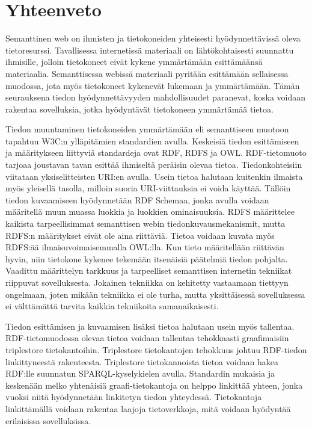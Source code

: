 \documentclass[finnish, 12pt, a4paper, elec, utf8, pdfa, online]{aaltothesis}
\begin{document}
{%
\clearpage
\section{Yhteenveto}
\enlargethispage{-2\baselineskip}

Semanttinen web on ihmisten ja tietokoneiden yhteisesti hyödynnettävissä oleva tietoresurssi. Tavallisessa internetissä materiaali on lähtökohtaisesti suunnattu ihmisille, jolloin tietokoneet eivät kykene ymmärtämään esittämäänsä materiaalia. Semanttisessa webissä materiaali pyritään esittämään sellaisessa muodossa, jota myös tietokoneet kykenevät lukemaan ja ymmärtämään. Tämän seurauksena tiedon hyödynnettävyyden mahdollisuudet paranevat, koska voidaan rakentaa sovelluksia, jotka hyödyntävät tietokoneen ymmärtämää tietoa.

Tiedon muuntaminen tietokoneiden ymmärtämään eli semanttiseen muotoon tapahtuu W3C:n ylläpitämien standardien avulla. Keskeisiä tiedon esittämiseen ja määritykseen liittyviä standardeja ovat RDF, RDFS ja OWL. RDF-tietomuoto tarjoaa joustavan tavan esittää ihmiseltä peräisin olevaa tietoa. Tiedonkohteisiin viitataan yksiselitteisten URI:en avulla. Usein tietoa halutaan kuitenkin ilmaista myös yleisellä tasolla, milloin suoria URI-viittauksia ei voida käyttää. Tällöin tiedon kuvaamiseen hyödynnetään RDF Schemaa, jonka avulla voidaan määritellä muun muassa luokkia ja luokkien ominaisuuksia. RDFS määrittelee kaikista tarpeellisimmat semanttisen webin tiedonkuvausmekanismit, mutta RDFS:n määritykset eivät ole aina riittäviä. Tietoa voidaan kuvata myös RDFS:ää ilmaisuvoimaisemmalla OWL:lla. Kun tieto määritellään riittävän hyvin, niin tietokone kykenee tekemään itsenäisiä päätelmiä tiedon pohjalta. Vaadittu määrittelyn tarkkuus ja tarpeelliset semanttisen internetin tekniikat riippuvat sovelluksesta. Jokainen tekniikka on kehitetty vastaamaan tiettyyn ongelmaan, joten mikään tekniikka ei ole turha, mutta yksittäisessä sovelluksessa ei välttämättä tarvita kaikkia tekniikoita samanaikaisesti.

Tiedon esittämisen ja kuvaamisen lisäksi tietoa halutaan usein myös tallentaa. RDF-tietomuodossa olevaa tietoa voidaan tallentaa tehokkaasti graafimaisiin triplestore tietokantoihin. Triplestore tietokantojen tehokkuus johtuu RDF-tiedon linkittyneestä rakenteesta. Triplestore tietokannoista tietoa voidaan hakea RDF:lle suunnatun SPARQL-kyselykielen avulla. Standardin mukaisia ja keskenään melko yhtenäisiä graafi-tietokantoja on helppo linkittää yhteen, jonka vuoksi niitä hyödynnetään linkitetyn tiedon yhteydessä. Tietokantoja linkittämällä voidaan rakentaa laajoja tietoverkkoja, mitä voidaan hyödyntää erilaisissa sovelluksissa.

}
\end{document}
